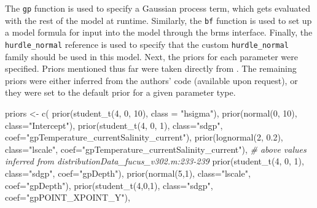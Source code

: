 \documentclass[
  12pt,
  oneside]{book}
\newenvironment{Shaded}{\begin{snugshade}}{\end{snugshade}}
\newcommand{\AttributeTok}[1]{\textcolor[rgb]{0.77,0.63,0.00}{#1}}
\newcommand{\CommentTok}[1]{\textcolor[rgb]{0.56,0.35,0.01}{\textit{#1}}}
\newcommand{\DecValTok}[1]{\textcolor[rgb]{0.00,0.00,0.81}{#1}}
\newcommand{\FloatTok}[1]{\textcolor[rgb]{0.00,0.00,0.81}{#1}}
\newcommand{\FunctionTok}[1]{\textcolor[rgb]{0.00,0.00,0.00}{#1}}
\newcommand{\NormalTok}[1]{#1}
\newcommand{\OtherTok}[1]{\textcolor[rgb]{0.56,0.35,0.01}{#1}}
\newcommand{\StringTok}[1]{\textcolor[rgb]{0.31,0.60,0.02}{#1}}
\theoremstyle{definition}
\theoremstyle{definition}
\theoremstyle{definition}
\theoremstyle{remark}
\begin{document}
The \texttt{gp} function is used to specify a Gaussian process term, which gets evaluated with the rest of the model at runtime.
Similarly, the \texttt{bf} function is used to set up a model formula for input into the model through the brms interface.
Finally, the \texttt{hurdle\_normal} reference is used to specify that the custom \texttt{hurdle\_normal} family should be used in this model.
Next, the priors for each parameter were specified.
Priors mentioned thus far were taken directly from \citet{Kotta2019}.
The remaining priors were either inferred from the authors' code (available upon request), or they were set to the default prior for a given parameter type.

\begin{Shaded}
\begin{Highlighting}[]
\NormalTok{priors }\OtherTok{\textless{}{-}} \FunctionTok{c}\NormalTok{(}
  \FunctionTok{prior}\NormalTok{(}\FunctionTok{student\_t}\NormalTok{(}\DecValTok{4}\NormalTok{, }\DecValTok{0}\NormalTok{, }\DecValTok{10}\NormalTok{), }\AttributeTok{class =} \StringTok{"hsigma"}\NormalTok{),}
  \FunctionTok{prior}\NormalTok{(}\FunctionTok{normal}\NormalTok{(}\DecValTok{0}\NormalTok{, }\DecValTok{10}\NormalTok{), }\AttributeTok{class=}\StringTok{"Intercept"}\NormalTok{),}
  \FunctionTok{prior}\NormalTok{(}\FunctionTok{student\_t}\NormalTok{(}\DecValTok{4}\NormalTok{, }\DecValTok{0}\NormalTok{, }\DecValTok{1}\NormalTok{), }\AttributeTok{class=}\StringTok{"sdgp"}\NormalTok{, }
        \AttributeTok{coef=}\StringTok{"gpTemperature\_currentSalinity\_current"}\NormalTok{),}
  \FunctionTok{prior}\NormalTok{(}\FunctionTok{lognormal}\NormalTok{(}\DecValTok{2}\NormalTok{, }\FloatTok{0.2}\NormalTok{), }\AttributeTok{class=}\StringTok{"lscale"}\NormalTok{, }
        \AttributeTok{coef=}\StringTok{"gpTemperature\_currentSalinity\_current"}\NormalTok{), }
  \CommentTok{\# above values inferred from distributionData\_fucus\_v302.m:233{-}239}
  \FunctionTok{prior}\NormalTok{(}\FunctionTok{student\_t}\NormalTok{(}\DecValTok{4}\NormalTok{, }\DecValTok{0}\NormalTok{, }\DecValTok{1}\NormalTok{), }\AttributeTok{class=}\StringTok{"sdgp"}\NormalTok{, }\AttributeTok{coef=}\StringTok{"gpDepth"}\NormalTok{),}
  \FunctionTok{prior}\NormalTok{(}\FunctionTok{normal}\NormalTok{(}\DecValTok{5}\NormalTok{,}\DecValTok{1}\NormalTok{), }\AttributeTok{class=}\StringTok{"lscale"}\NormalTok{, }\AttributeTok{coef=}\StringTok{"gpDepth"}\NormalTok{),}
  \FunctionTok{prior}\NormalTok{(}\FunctionTok{student\_t}\NormalTok{(}\DecValTok{4}\NormalTok{,}\DecValTok{0}\NormalTok{,}\DecValTok{1}\NormalTok{), }\AttributeTok{class=}\StringTok{"sdgp"}\NormalTok{, }\AttributeTok{coef=}\StringTok{"gpPOINT\_XPOINT\_Y"}\NormalTok{),}

\end{Highlighting}
\end{Shaded}
\end{document}
